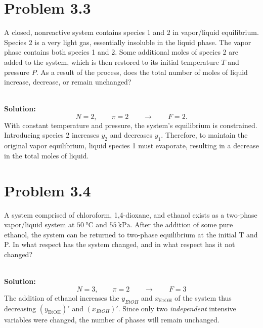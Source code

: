 \documentclass{article}
\newenvironment{solution}{\par\noindent\textbf{\\Solution:\\}}{\par\medskip}
\begin{document}
\section*{Problem 3.3}
A closed, nonreactive system contains species 1 and 2 in vapor/liquid
equilibrium. Species 2 is a very light gas, essentially insoluble in
the liquid phase. The vapor phase contains both species 1 and 2. Some
additional moles of species 2 are added to the system, which is then
restored to its initial temperature \( T \) and pressure \( P \). As
a result of the process, does the total number of moles of liquid
increase, decrease, or remain unchanged?

\begin{solution}
  \begin{equation*}
    N=2, \qquad \pi=2 \qquad \to \qquad F=2.
  \end{equation*}
  With constant temperature and pressure, the system's equilibrium is
  constrained. Introducing species 2 increases $y_2$ and decreases
  $y_1$. Therefore, to maintain the original vapor equilibrium,
  liquid species 1 must evaporate, resulting in a decrease in the
  total moles of liquid.
\end{solution}


\section*{Problem 3.4}
A system comprised of chloroform, 1,4-dioxane, and ethanol exists as
a two-phase vapor/liquid system at $50~\unit{ \degreeCelsius }$ and
$55~\unit{ \kilo\pascal }$. After the addition of some pure ethanol,
the system can be returned to two-phase equilibrium at the initial T
and P. In what respect has the system changed, and in what respect
has it not changed?

\begin{solution}
  \begin{equation*}
    N=3, \qquad \pi=2 \qquad \to \qquad F=3
  \end{equation*}
  The addition of ethanol increases the $y_{EtOH}$ and
  $x_{\text{EtOH}}$ of the system thus decreasing $\left(
  y_{\text{EtOH}} \right)'$ and $\left( x_{EtOH} \right)'$. Since
  only two \textit{independent} intensive variables were changed, the
  number of phases will remain unchanged.
\end{solution}
\end{document}
